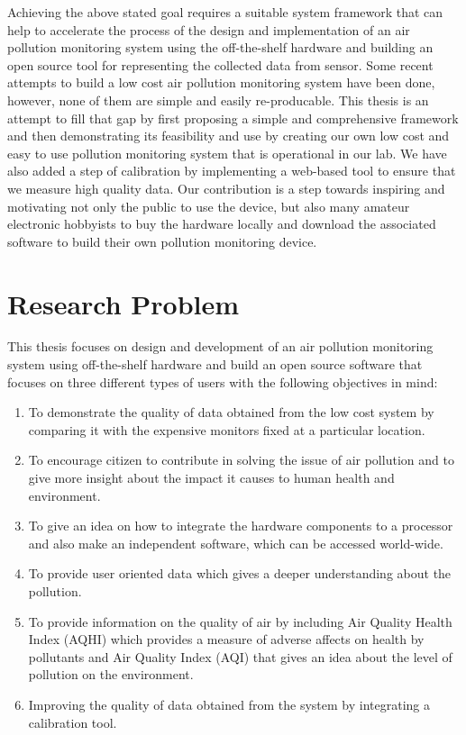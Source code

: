 \par

Achieving the above stated goal requires a suitable system framework that can help to accelerate the process of the design and implementation of an air pollution monitoring system using the off-the-shelf hardware and building an open source tool for representing the collected data from sensor. Some recent attempts to build a low cost air pollution monitoring system have been done, however, none of them are simple and easily re-producable. This thesis is an attempt to fill that gap by first proposing a simple and comprehensive framework and then demonstrating its feasibility and use by creating our own low cost and easy to use pollution monitoring system that is operational in our lab. We have also added a step of calibration by implementing a web-based tool to ensure that we measure high quality data. Our contribution is a step towards inspiring and motivating not only the public to use the device, but also many amateur electronic hobbyists to buy the hardware locally and download the associated software to build their own pollution monitoring device.


\section{Research Problem}

This thesis focuses on design and development of an air pollution monitoring system using off-the-shelf
hardware and build an open source software that focuses on three different types of users with the following objectives in mind:
\begin{enumerate}
  \item To demonstrate the quality of data obtained from the low cost system by comparing it with the expensive monitors fixed at a particular location.
  
  \item To encourage citizen to contribute in solving the issue of air pollution and to give more insight about the impact it causes to human health and environment.
   
  \item To give an idea on how to integrate the hardware components to a processor and also make an independent software, which can be accessed world-wide.
  
  \item To provide user oriented data which gives a deeper understanding about the pollution.
  
  \item To provide information on the quality of air by including Air Quality Health Index (AQHI) which provides a measure of adverse affects on health by pollutants and Air Quality Index (AQI) that gives an idea about the level of pollution on the environment.

  
  \item Improving the quality of data obtained from the system by integrating a calibration tool.
  

   

\end{enumerate}


